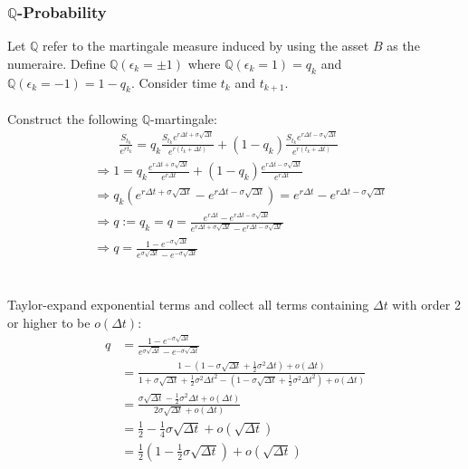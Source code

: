 \documentclass[12pt]{article}
\begin{document}
\subsubsection{$\mathbb{Q}$-Probability}
Let $\mathbb{Q}$ refer to the martingale measure induced by using the asset $B$ as the numeraire. Define $\mathbb{Q}(\epsilon_k = \pm 1)$ where $\mathbb{Q}(\epsilon_k =1) = q_k$ and $\mathbb{Q}(\epsilon_k =-1) = 1-q_k$. Consider 
time $t_k$ and $t_{k+1}$. \\ \\ 
Construct the following $\mathbb{Q}$-martingale:
\begin{align*}
&\qquad \frac{S_{t_k}}{e^{rt_k}} = q_k\frac{S_{t_k}e^{r\Delta t + \sigma \sqrt{\Delta t}}}{e^{r(t_k+\Delta t)}} + (1-q_k)\frac{S_{t_k}e^{r\Delta t - \sigma \sqrt{\Delta t}}}{e^{r(t_k+\Delta t)}}\\
&\Rightarrow 1 = q_k\frac{e^{r\Delta t + \sigma \sqrt{\Delta t}}}{e^{r\Delta t}} + (1-q_k) \frac{e^{r\Delta t - \sigma \sqrt{\Delta t}}}{e^{r\Delta t}} \\
&\Rightarrow q_k(e^{r\Delta t + \sigma \sqrt{\Delta t}} - e^{r\Delta t - \sigma \sqrt{\Delta t}}) = e^{r\Delta t} - e^{r\Delta t - \sigma \sqrt{\Delta t}} \\
&\Rightarrow q := q_k = q = \frac{e^{r\Delta t} - e^{r\Delta t - \sigma \sqrt{\Delta t}}}{e^{r\Delta t + \sigma \sqrt{\Delta t}} - e^{r\Delta t - \sigma \sqrt{\Delta t}}} \tag*{As $q_k$ does not depend on $k$} \\
& \Rightarrow q = \frac{1-e^{ - \sigma \sqrt{\Delta t}}}{e^{  \sigma \sqrt{\Delta t}}-e^{ - \sigma \sqrt{\Delta t}}}
\end{align*} 
\\\\
Taylor-expand exponential terms and collect all terms containing $\Delta t$ with order 2 or higher to be $o(\Delta t)$:
\begin{align*}
  q &= \frac{1-e^{ - \sigma \sqrt{\Delta t}}}{e^{  \sigma \sqrt{\Delta t}}-e^{ - \sigma \sqrt{\Delta t}}}\\
  &= \frac{1-(1 - \sigma \sqrt{\Delta t} + \frac{1}{2}\sigma^2\Delta t) + o(\Delta t)}
    {1 + \sigma \sqrt{\Delta t} + \frac{1}{2}\sigma^2\Delta t^2 - (1 - \sigma \sqrt{\Delta t} + \frac{1}{2}\sigma^2\Delta t^2) + o(\Delta t)} \\
  &= \frac{\sigma \sqrt{\Delta t} - \frac{1}{2} \sigma^2\Delta t + o(\Delta t)}{2\sigma\sqrt{\Delta t} + o(\Delta t)}\\
  &= \frac{1}{2} - \frac{1}{4}\sigma\sqrt{\Delta t} + o(\sqrt{\Delta t}) \\
  &= \frac{1}{2}(1 - \frac{1}{2}\sigma\sqrt{\Delta t}) + o(\sqrt{\Delta t})
\end{align*}
\end{document}
